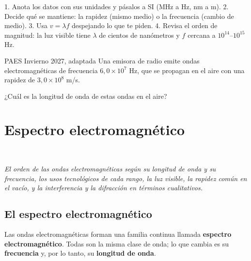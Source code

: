 \begin{clave} 1. Anota los datos con sus unidades y pásalos a SI (MHz a Hz, nm a m). 2. Decide qué se mantiene: la rapidez (mismo medio) o la frecuencia (cambio de medio). 3. Usa $v = \lambda f$ despejando lo que te piden. 4. Revisa el orden de magnitud: la luz visible tiene $\lambda$ de cientos de nanómetros y $f$ cercana a $10^{14}$--$10^{15}$ Hz.\end{clave}
\begin{elejemplo}{PAES Invierno 2027, adaptada}
Una emisora de radio emite ondas electromagnéticas de frecuencia $6{,}0\times10^{7}$ Hz, que se propagan en el aire con una rapidez de $3{,}0\times10^{8}$ m/s.

¿Cuál es la longitud de onda de estas ondas en el aire?
\end{elejemplo}

\section[Espectro electromagnético]{Espectro electromagnético}
\modcomun\ \ {\color{gris}\itshape El orden de las ondas electromagnéticas según su longitud de onda y su frecuencia, los usos tecnológicos de cada rango, la luz visible, la rapidez común en el vacío, y la interferencia y la difracción en términos cualitativos.\par}
\subsection{El espectro electromagnético}
Las ondas electromagnéticas forman una familia continua llamada \textbf{espectro electromagnético}. Todas son la misma clase de onda; lo que cambia es su \textbf{frecuencia} y, por lo tanto, su \textbf{longitud de onda}.

